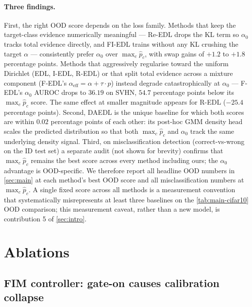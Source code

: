 \documentclass[review,5p,times]{elsarticle}
\begin{document}
\paragraph{Three findings.}
First, the right OOD score depends on the loss family. Methods that
keep the target-class evidence numerically meaningful --- Re-EDL drops
the KL term so $\alpha_0$ tracks total evidence directly, and FI-EDL
trains without any KL crushing the target $\alpha$ --- consistently
prefer $\alpha_0$ over $\max_c\hat p_c$, with swap gains of $+1.2$ to
$+1.8$ percentage points. Methods that aggressively regularise toward
the uniform Dirichlet (EDL, I-EDL, R-EDL) or that split total evidence
across a mixture component (F-EDL's
$\alpha_{\text{eff}}\!=\!\alpha\!+\!\tau\!\cdot\!p$) instead degrade
catastrophically at $\alpha_0$ --- F-EDL's $\alpha_0$ AUROC drops to
$36.19$ on SVHN, $54.7$ percentage points below its $\max_c\hat p_c$
score. The same effect at smaller magnitude appears for R-EDL ($-25.4$
percentage points). Second, DAEDL is the unique baseline for which both
scores are within $0.02$ percentage points of each other: its post-hoc
GMM density head scales the predicted distribution so that both
$\max_c\hat p_c$ and $\alpha_0$ track the same underlying density
signal. Third, on misclassification detection (correct-vs-wrong on the
ID test set) a separate audit (not shown for brevity) confirms that
$\max_c\hat p_c$ remains the best score across every method including
ours; the $\alpha_0$ advantage is OOD-specific. We therefore report all
headline OOD numbers in \autoref{sec:main} at each method's best OOD
score and all misclassification numbers at $\max_c\hat p_c$. A single
fixed score across all methods is a measurement convention that
systematically misrepresents at least three baselines on the
\autoref{tab:main-cifar10} OOD comparison; this measurement caveat,
rather than a new model, is contribution 5 of \autoref{sec:intro}.

\section{Ablations}\label{sec:ablations}

\subsection{FIM controller: gate-on causes calibration
collapse}\label{sec:abl-gate}
\end{document}
